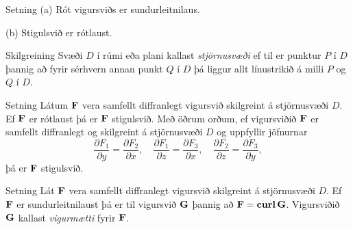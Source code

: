 \begin{frame}{} 

\begin {block}{Setning \rtask{}}
 (a) Rót vigursviðs er sundurleitnilaus.

(b) Stigulsvið er rótlaust.

   \medskip
\end{block}

\end{frame}




\begin{frame}{} 

\begin {block}{Skilgreining \rtask{}}
  Svæði $D$ í rúmi eða plani kallast {\em
  stjörnusvæði} ef til er punktur $P$ í $D$ þannig að fyrir sérhvern
annan punkt $Q$ í $D$ þá liggur allt línustrikið á milli $P$ og $Q$ í
$D$. 

\end{block}

\end{frame}




\begin{frame}{} 

\begin {block}{Setning \rtask{}}
Látum $\mbox{${\bf F}$}$ vera samfellt diffranlegt vigursvið
skilgreint á stjörnusvæði $D$.  Ef $\mbox{${\bf F}$}$ er rótlaust þá er $\mbox{${\bf F}$}$
stigulsvið.  Með öðrum orðum, ef vigursviðið  $\mbox{${\bf F}$}$ er samfellt
diffranlegt og skilgreint á stjörnusvæði $D$ og uppfyllir jöfnurnar
$$\frac{\partial F_1}{\partial y}=
\frac{\partial F_2}{\partial x},\quad
\frac{\partial F_1}{\partial z}=
\frac{\partial F_3}{\partial x},\quad
\frac{\partial F_2}{\partial z}=
\frac{\partial F_3}{\partial y},$$
þá er $\mbox{${\bf F}$}$ stigulsvið.
\end{block}

\end{frame}




\begin{frame}{} 

\begin {block}{Setning \rtask{}}
 Lát $\mbox{${\bf F}$}$ vera samfellt diffranlegt vigursvið skilgreint á stjörnusvæði $D$.  Ef $\mbox{${\bf F}$}$ er sundurleitnilaust þá er til vigursvið $\mbox{${\bf G}$}$ þannig að $\mbox{${\bf F}$}=\mbox{${\rm\bf curl\,}$}\mbox{${\bf G}$}$.  Vigursviðið $\mbox{${\bf G}$}$ kallast {\em vigurmætti} fyrir $\mbox{${\bf F}$}$.
\end{block}

\end{frame}

